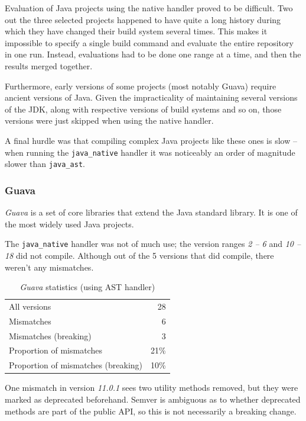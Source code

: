 \documentclass{l4proj}
\newcommand\genericstyle{\lstset{basicstyle=\ttm}}
\newcommand\codeinline[1]{{\genericstyle\lstinline!#1!}}
\begin{document}
Evaluation of Java projects using the native handler proved to be difficult.
Two out the three selected projects happened to have quite a long
history during which they have changed their build system several
times. This makes it impossible to specify a single build command and
evaluate the entire repository in one run. Instead, evaluations had to
be done one range at a time, and then the results merged together.

Furthermore, early versions of some projects (most notably Guava)
require ancient versions of Java. Given the impracticality of
maintaining several versions of the JDK, along with respective
versions of build systems and so on, those versions were just skipped
when using the native handler.

A final hurdle was that compiling complex Java projects like these
ones is slow -- when running the \codeinline{java_native} handler it
was noticeably an order of magnitude slower than \codeinline{java_ast}.

\subsubsection{Guava}

\textit{Guava} \cite{Guava} is a set of core libraries that extend the
Java standard library. It is one of the most widely used Java
projects.

The \codeinline{java_native} handler was not of much use; the version
ranges \textit{2 -- 6} and \textit{10 -- 18} did not compile. Although
out of the 5 versions that did compile, there weren't any mismatches.

\begin{table}
\centering
\caption{\textit{Guava} statistics (using AST handler)}
\label{GuavaStatistics}
\begin{tabular}{|lr|}
All versions & 28 \\
Mismatches & 6 \\
Mismatches (breaking) & 3 \\
Proportion of mismatches & 21\% \\
Proportion of mismatches (breaking) & 10\% \\
\end{tabular}
\end{table}

One mismatch in version \textit{11.0.1} sees two utility methods
removed, but they were marked as deprecated beforehand. Semver is
ambiguous as to whether deprecated methods are part of the public API,
so this is not necessarily a breaking change.
\end{document}
